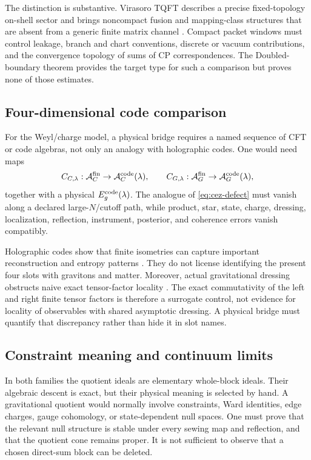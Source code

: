 \documentclass[11pt,a4paper]{article}
\theoremstyle{definition}
\theoremstyle{remark}
\newcommand{\A}{\mathcal A}
\begin{document}
The distinction is substantive.  Virasoro TQFT describes a precise fixed-topology
on-shell sector and brings noncompact fusion and mapping-class structures that are
absent from a generic finite matrix channel
\cite{CollierEberhardtZhang2023,CollierEberhardtZhang2024}.  Compact packet windows must
control leakage, branch and chart conventions, discrete or vacuum contributions, and
the convergence topology of sums of CP correspondences.  The Doubled-boundary theorem provides
the target type for such a comparison but proves none of those estimates.

\subsection{Four-dimensional code comparison}

For the Weyl/charge model, a physical bridge requires a named sequence of CFT or code
algebras, not only an analogy with holographic codes.  One would need maps
\begin{equation}
 C_{C,\lambda}:\A_C^{\rm fin}\to\A_C^{\rm code}(\lambda),\qquad
 C_{G,\lambda}:\A_G^{\rm fin}\to\A_G^{\rm code}(\lambda),
 \label{eq:code-comparison}
\end{equation}
together with a physical $E_g^{\rm code}(\lambda)$.  The analogue of
\eqref{eq:cez-defect} must vanish along a declared large-$N$/cutoff path, while product,
star, state, charge, dressing, localization, reflection, instrument, posterior, and
coherence errors vanish compatibly.

Holographic codes show that finite isometries can capture important reconstruction and
entropy patterns \cite{PastawskiEtAl2015,Harlow2017}.  They do not license identifying
the present four slots with gravitons and matter.  Moreover, actual gravitational
dressing obstructs naive exact tensor-factor locality
\cite{DonnellyGiddings2016}.  The exact commutativity of the left and right finite tensor
factors is therefore a surrogate control, not evidence for locality of observables with
shared asymptotic dressing.  A physical bridge must quantify that discrepancy rather
than hide it in slot names.

\subsection{Constraint meaning and continuum limits}

In both families the quotient ideals are elementary whole-block ideals.  Their
algebraic descent is exact, but their physical meaning is selected by hand.  A
gravitational quotient would normally involve constraints, Ward identities, edge
charges, gauge cohomology, or state-dependent null spaces.  One must prove that the
relevant null structure is stable under every sewing map and reflection, and that the
quotient cone remains proper.  It is not sufficient to observe that a chosen direct-sum
block can be deleted.
\end{document}
